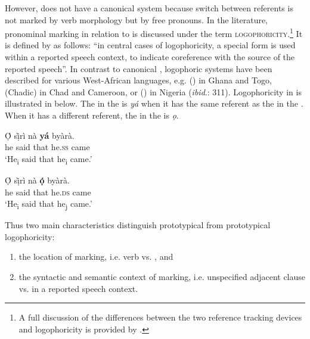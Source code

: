 \documentclass[output=paper,newtxmath,modfonts,nonflat,hidelinks]{langsci/langscibook}
\begin{document}
However,  does not have a canonical  system because switch between referents is not marked by verb morphology but by free pronouns. In the literature, pronominal marking in relation to  is discussed under the term \textsc{logophoricity}.\footnote{A full discussion of the differences between the two reference tracking devices  and logophoricity is provided by \citet[50-56]{Stirling1993}.} It is defined by \citet[1]{Stirling1993} as follows: “in central cases of logophoricity, a special  form is used within a reported speech context, to indicate coreference with the source of the reported speech”. In contrast to canonical , logophoric systems have been described for various West-African languages, e.g.  () in Ghana and Togo,  (Chadic) in Chad and Cameroon, or  () in Nigeria (\textit{ibid}.: 311). Logophoricity in  is illustrated in  below. The   in the  is \textit{yá} when it has the same referent as the  in the . When it has a different referent, the  in the  is \textit{ọ}.

\ea\label{ex:apel:19}
{ \citep[19]{HymanComrie81}}
\ea\label{ex:apel:19a}
\gll Ọ́ s\`ịr\`i   nà  \textbf{yá} byàrà. \\
     he said that he.\textsc{ss} came \\
\glt ‘He\textsubscript{i} said that he\textsubscript{i} came.’


\ex\label{ex:apel:19b}
\gll Ọ́ sị̀rì  nà  \textbf{ọ́} byàrà.\\
     he said that he.\textsc{ds} came \\
\glt ‘He\textsubscript{i} said that he\textsubscript{j} came.’
\z
\z

Thus two main characteristics distinguish prototypical  from prototypical logophoricity: 

\begin{enumerate}
\item the location of marking, i.e. verb vs. , and 

\item the syntactic and semantic context of marking, i.e. unspecified adjacent clause vs.  in a reported speech context.
\end{enumerate}
\end{document}
